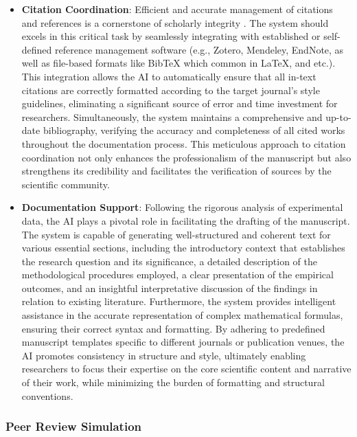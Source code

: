 \begin{itemize}
    \item \textbf{Citation Coordination}: Efficient and accurate management of citations and references is a cornerstone of scholarly integrity \cite{bom2023exploring}. The system should excels in this critical task by seamlessly integrating with established or self-defined reference management software (e.g., Zotero, Mendeley, EndNote, as well as file-based formats like BibTeX which common in LaTeX, and etc.). This integration allows the AI to automatically ensure that all in-text citations are correctly formatted according to the target journal's style guidelines, eliminating a significant source of error and time investment for researchers. Simultaneously, the system maintains a comprehensive and up-to-date bibliography, verifying the accuracy and completeness of all cited works throughout the documentation process. This meticulous approach to citation coordination not only enhances the professionalism of the manuscript but also strengthens its credibility and facilitates the verification of sources by the scientific community.

    \item \textbf{Documentation Support}: Following the rigorous analysis of experimental data, the AI plays a pivotal role in facilitating the drafting of the manuscript. The system is capable of generating well-structured and coherent text for various essential sections, including the introductory context that establishes the research question and its significance, a detailed description of the methodological procedures employed, a clear presentation of the empirical outcomes, and an insightful interpretative discussion of the findings in relation to existing literature. Furthermore, the system provides intelligent assistance in the accurate representation of complex mathematical formulas, ensuring their correct syntax and formatting. By adhering to predefined manuscript templates specific to different journals or publication venues, the AI promotes consistency in structure and style, ultimately enabling researchers to focus their expertise on the core scientific content and narrative of their work, while minimizing the burden of formatting and structural conventions.
    
\end{itemize}


\subsubsection*{Peer Review Simulation}

